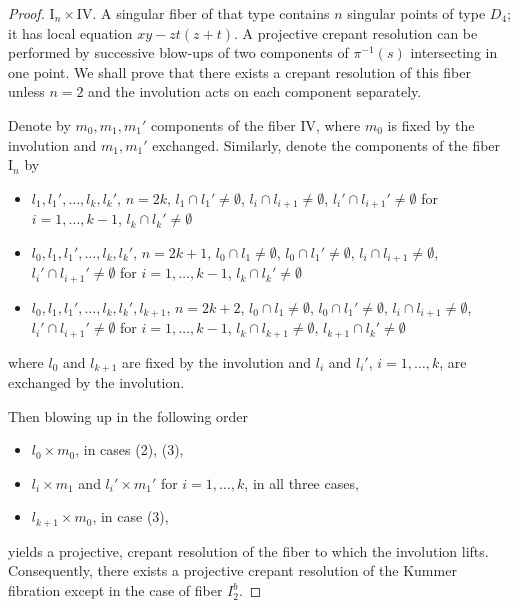 \documentclass[a4paper]{amsart}
\theoremstyle{plain}
\theoremstyle{definition}
\theoremstyle{remark}
\numberwithin{equation}{section}
\begin{document}
\begin{proof}
\vspace{2mm}
\medskip
\noindent\emph{$\mathrm{I}_n \times \mathrm{IV}$}.
A singular fiber of that type contains $n$ singular points of type $D_{4}$;
it has local equation $xy-zt(z+t)$. A projective crepant resolution can be performed by successive blow-ups of two components of $\pi^{-1}(s)$ intersecting in one point. We shall prove that there exists a crepant resolution of this fiber unless $n=2$ and the involution acts on each component separately.

Denote by $m_{0}, m_{1},m_{1}'$ components of the fiber $\mathrm{IV}$, where $m_{0}$ is fixed by the involution and $m_{1}, m_{1}'$ exchanged. Similarly, denote the
components of the fiber $\mathrm{I}_{n}$ by
\begin{itemize}
	\item [$\mathrm{I}_{2k}^{a}$:] $l_{1}, l_{1}',\dots,l_{k}, l_{k}'$, $n=2k$, $l_{1}\cap l_{1}'\ne\emptyset$,  $l_{i}\cap l_{i+1}\ne\emptyset$,   $l_{i}'\cap l_{i+1}'\ne\emptyset$ for $i=1,\dots,k-1$,  $l_{k}\cap l_{k}'\ne\emptyset$
	\item[$\mathrm{I}_{2k+1}$:] $l_{0}, l_{1}, l_{1}',\dots,l_{k}, l_{k}'$, $n=2k+1$, $l_{0}\cap l_{1}\ne\emptyset$, $l_{0}\cap l_{1}'\ne\emptyset$,  $l_{i}\cap l_{i+1}\ne\emptyset$,   $l_{i}'\cap l_{i+1}'\ne\emptyset$ for $i=1,\dots,k-1$,  $l_{k}\cap l_{k}'\ne\emptyset$
	\item[$\mathrm{I}_{2k+2}^{b}$:] $l_{0}, l_{1}, l_{1}',\dots,l_{k}, l_{k}',l_{k+1}$, $n=2k+2$, $l_{0}\cap l_{1}\ne\emptyset$, $l_{0}\cap l_{1}'\ne\emptyset$,  $l_{i}\cap l_{i+1}\ne\emptyset$,   $l_{i}'\cap l_{i+1}'\ne\emptyset$ for $i=1,\dots,k-1$,  $l_{k}\cap l_{k+1}\ne\emptyset$,  $l_{k+1}\cap l_{k}'\ne\emptyset$
\end{itemize}
 where $l_{0}$ and $l_{k+1}$ are fixed by the involution and $l_{i}$ and $l_{i}'$, $i=1,\dots,k$, are exchanged by the involution.

 Then blowing up in the following order
 \begin{itemize}
 	\item $l_{0}\times m_{0}$, in cases (2), (3),
	\item $l_{i}\times m_{1}$ and $l_{i}'\times m_{1}'$ for
	$i=1,\ldots,k$, in all three cases,
 	\item  $l_{k+1}\times m_{0}$, in case (3),
 \end{itemize}
 yields a projective, crepant resolution of the fiber to which the involution lifts.
 Consequently, there exists a projective crepant resolution of the Kummer fibration except in the case of fiber $I_{2}^{b}$.


\end{proof}
\end{document}
